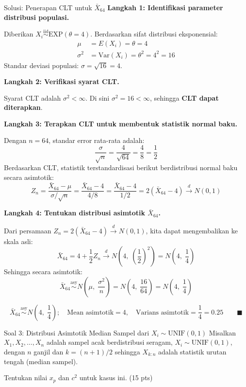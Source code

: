 \documentclass[10pt,twoside]{article}
\begin{document}
\begin{solbox}{Solusi: Penerapan CLT untuk $\bar{X}_{64}$}
\textbf{Langkah 1: Identifikasi parameter distribusi populasi.}

Diberikan $X_i \overset{\mathrm{iid}}{\sim} \mathrm{EXP}(\theta = 4)$. Berdasarkan sifat distribusi eksponensial:
\begin{align*}
\mu &= E(X_i) = \theta = 4 \\
\sigma^2 &= \mathrm{Var}(X_i) = \theta^2 = 4^2 = 16
\end{align*}
Standar deviasi populasi: $\sigma = \sqrt{16} = 4$.

\textbf{Langkah 2: Verifikasi syarat CLT.}

Syarat CLT adalah $\sigma^2 < \infty$. Di sini $\sigma^2 = 16 < \infty$, sehingga \textbf{CLT dapat diterapkan}.

\textbf{Langkah 3: Terapkan CLT untuk membentuk statistik normal baku.}

Dengan $n = 64$, standar error rata-rata adalah:
\[
\frac{\sigma}{\sqrt{n}} = \frac{4}{\sqrt{64}} = \frac{4}{8} = \frac{1}{2}
\]
Berdasarkan CLT, statistik terstandardisasi berikut berdistribusi normal baku secara asimtotik:
\[
Z_n = \frac{\bar{X}_{64} - \mu}{\sigma / \sqrt{n}} = \frac{\bar{X}_{64} - 4}{4/8} = \frac{\bar{X}_{64} - 4}{1/2} = 2(\bar{X}_{64} - 4) \xrightarrow{d} N(0, 1)
\]

\textbf{Langkah 4: Tentukan distribusi asimtotik $\bar{X}_{64}$.}

Dari persamaan $Z_n = 2(\bar{X}_{64} - 4) \xrightarrow{d} N(0,1)$, kita dapat mengembalikan ke skala asli:
\[
\bar{X}_{64} = 4 + \frac{1}{2} Z_n \xrightarrow{d} N\!\left(4,\; \left(\frac{1}{2}\right)^2\right) = N\!\left(4,\; \frac{1}{4}\right)
\]
Sehingga secara asimtotik:
\[
\bar{X}_{64} \stackrel{\mathrm{asy}}{\sim} N\!\left(\mu,\; \frac{\sigma^2}{n}\right) = N\!\left(4,\; \frac{16}{64}\right) = N\!\left(4,\; \frac{1}{4}\right)
\]

\[
\boxed{\bar{X}_{64} \stackrel{\mathrm{asy}}{\sim} N\!\left(4,\;\frac{1}{4}\right); \quad \text{Mean asimtotik} = 4, \quad \text{Varians asimtotik} = \frac{1}{4} = 0.25} \qquad \blacksquare
\]
\end{solbox}

\begin{soalbox}{Soal 3: Distribusi Asimtotik Median Sampel dari $X_i \sim \mathrm{UNIF}(0,1)$}
Misalkan $X_1, X_2, \dots, X_n$ adalah sampel acak berdistribusi seragam, $X_i \sim \mathrm{UNIF}(0,1)$, dengan $n$ ganjil dan $k = (n+1)/2$ sehingga $X_{k:n}$ adalah statistik urutan tengah (median sampel).

Tentukan nilai $x_p$ dan $c^2$ untuk kasus ini. (15 pts)
\end{soalbox}
\end{document}
